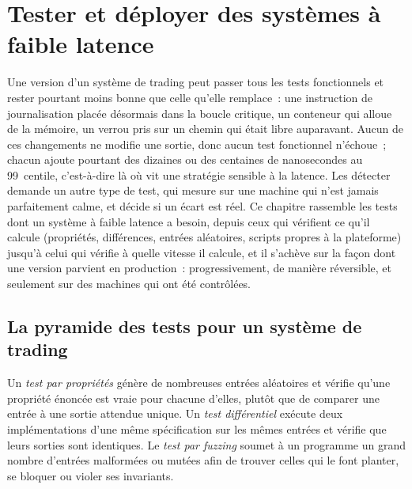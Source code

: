 \chapter{Tester et déployer des systèmes à faible latence}\label{ch:ll:testing-and-deploying-low-latency-systems}

Une version d'un système de trading peut passer tous les tests fonctionnels et rester pourtant moins bonne que celle qu'elle remplace~: une instruction de journalisation
placée désormais dans la boucle critique, un conteneur qui alloue de la mémoire, un verrou pris sur un chemin qui était libre auparavant. Aucun de ces
changements ne modifie une sortie, donc aucun test fonctionnel n'échoue~; chacun ajoute pourtant des dizaines ou des centaines de nanosecondes au 99~centile, c'est-à-dire
là où vit une stratégie sensible à la latence. Les détecter demande un autre type de test, qui mesure sur une machine qui
n'est jamais parfaitement calme, et décide si un écart est réel. Ce chapitre rassemble les tests dont un système à faible latence
a besoin, depuis ceux qui vérifient ce qu'il calcule (propriétés, différences, entrées aléatoires, scripts propres à la plateforme) jusqu'à celui
qui vérifie à quelle vitesse il calcule, et il s'achève sur la façon dont une version parvient en production~: progressivement, de manière réversible, et seulement sur
des machines qui ont été contrôlées.

\section{La pyramide des tests pour un système de trading}

\begin{definition}\label{def:ll:testing-and-deploying-low-latency-systems:tests}
Un \emph{test par propriétés} génère de nombreuses entrées aléatoires et vérifie qu'une propriété énoncée est vraie
pour chacune d'elles, plutôt que de comparer une entrée à une sortie attendue unique. Un \emph{test
différentiel} exécute deux implémentations d'une même spécification sur les mêmes entrées et vérifie que leurs
sorties sont identiques. Le \emph{test par fuzzing} soumet à un programme un grand nombre d'entrées malformées ou mutées
afin de trouver celles qui le font planter, se bloquer ou violer ses invariants.
\end{definition}

